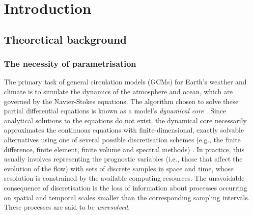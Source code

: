 \documentclass[../main.tex]{subfiles}
\begin{document}
\ifSubfilesClassLoaded{
    \frontmatter
    \tableofcontents
    \mainmatter
}{}

\chapter{Introduction} \label{chap:introduction}


\section{Theoretical background} \label{sec:theory_background}

\subsection{The necessity of parametrisation}
The primary task of general circulation models (GCMs) for Earth's weather and
climate is to simulate the dynamics of the atmosphere and ocean, which are
governed by the Navier-Stokes equations. The algorithm chosen to solve these
partial differential equations is known as a model's \emph{dynamical core}
\parencite{mcfarlane2011}. Since analytical solutions to the equations do not
exist, the dynamical core necessarily approximates the continuous equations
with finite-dimensional, exactly solvable alternatives using one of several
possible discretisation schemes (e.g., the finite difference, finite element,
finite volume and spectral methods) \parencite{christensen2022}. In practice,
this usually involves representing the prognostic variables (i.e., those that
affect the evolution of the flow) with sets of discrete samples in space and
time, whose resolution is constrained by the available computing resources. The
unavoidable consequence of discretisation is the loss of information about
processes occurring on spatial and temporal scales smaller than the
corresponding sampling intervals. These processes are said to be
\emph{unresolved}.
\end{document}
